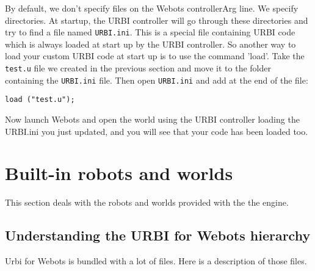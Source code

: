 By default, we don't specify files on the Webots controllerArg
line. We specify directories.  At startup, the URBI controller will go
through these directories and try to find a file named
\nolinkurl{URBI.ini}. This is a special file containing URBI code
which is always loaded at start up by the URBI controller. So another
way to load your custom URBI code at start up is to use the command
'load'.  Take the \nolinkurl{test.u} file we created in the previous
section and move it to the folder containing the \nolinkurl{URBI.ini}
file. Then open \nolinkurl{URBI.ini} and add at the end of the file:


\begin{lstlisting}[firstnumber=1,]
      load ("test.u");
\end{lstlisting}
Now launch Webots and open the world using the URBI controller loading
the URBI.ini you just updated, and you will see that your code has
been loaded too.


\section{Built-{}in robots and worlds}
\label{webots.builtin}%

This section deals with the robots and worlds provided with the the
engine.


\subsection{Understanding the URBI for Webots hierarchy}
\label{webots.builtin.hierarchy}%

 Urbi for Webots is bundled with a lot of files. Here is a description of
those files.

